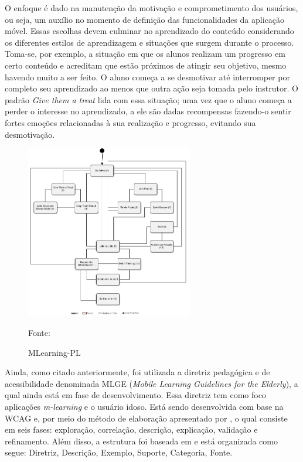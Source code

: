O enfoque é dado na manutenção da motivação e comprometimento dos usuários, ou seja, um auxílio no momento de definição das funcionalidades da aplicação móvel. Essas escolhas devem culminar no aprendizado do conteúdo considerando os diferentes estilos de aprendizagem e situações que surgem durante o processo. Toma-se, por exemplo, a situação em que os alunos realizam um progresso em certo conteúdo e acreditam que estão próximos de atingir seu objetivo, mesmo havendo muito a ser feito. O aluno começa a se desmotivar até interromper por completo seu aprendizado ao menos que outra ação seja tomada pelo instrutor. O padrão \textit{Give them a treat} lida com essa situação; uma vez que o aluno começa a perder o interesse no aprendizado, a ele são dadas recompensas fazendo-o sentir fortes emoções relacionadas à sua realização e progresso, evitando sua desmotivação.

\begin{figure}[H]
\centering
    \caption{MLearning-PL}
    \label{fig:ml-pl}
    \includegraphics[width=0.65\textwidth]{Figuras/mlearning-pl.png}
    
    Fonte: \cite{Fioravanti2017_plop}
\end{figure}

Ainda, como citado anteriormente, foi utilizada a diretriz pedagógica e de acessibilidade denominada MLGE (\textit{Mobile Learning Guidelines for the Elderly}), a qual ainda está em fase de desenvolvimento. Essa diretriz tem como foco aplicações \textit{m-learning} e o usuário idoso. Está sendo desenvolvida com base na WCAG e, por meio do método de elaboração apresentado por \cite{rusu2011}, o qual consiste em seis fases: exploração, correlação, descrição, explicação, validação e refinamento. Além disso, a estrutura foi baseada em \cite{baranauskas2003} e está organizada como segue: Diretriz, Descrição, Exemplo, Suporte, Categoria, Fonte.

